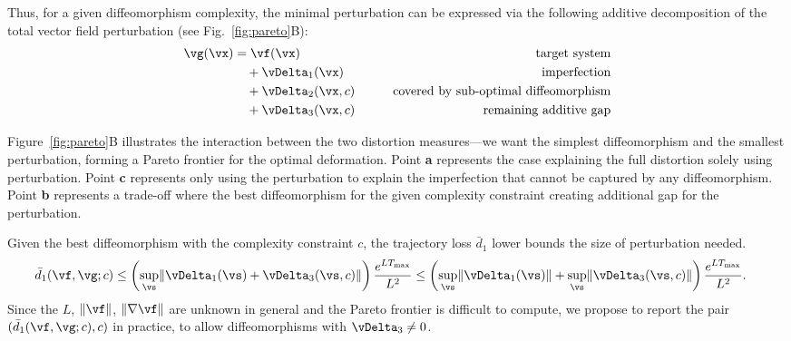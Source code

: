 \documentclass{article}
\theoremstyle{definition} \newtheorem{definition}{Definition}  \newtheorem{example}{Example}
\theoremstyle{remark} \newtheorem{remark}{Remark}
\newcounter{ct}
\DeclarePairedDelimiter{\norm}{\lVert}{\rVert}
\begin{document}
Thus, for a given diffeomorphism complexity, the minimal perturbation can be expressed via the following additive decomposition of the total vector field perturbation (see Fig.~\ref{fig:pareto}B):
\begin{align}\label{eq:decomp:triple}
    \vg(\vx) &= 
	\vf(\vx)
	&\qquad\text{target system}
	\\
	&\quad+\vDelta_1(\vx)
	&\qquad\text{imperfection}
	\\
	&\quad+\vDelta_2(\vx, c)
	&\qquad\text{covered by sub-optimal diffeomorphism}
	\\
	&\quad+\vDelta_3(\vx, c)
	&\qquad\text{remaining additive gap}
\end{align}

Figure~\ref{fig:pareto}B illustrates the interaction between the two distortion measures---we want the simplest diffeomorphism and the smallest perturbation, forming a Pareto frontier for the optimal deformation.
Point \textbf{a} represents the case explaining the full distortion solely using perturbation.
Point \textbf{c} represents only using the perturbation to explain the imperfection that cannot be captured by any diffeomorphism.
Point \textbf{b} represents a trade-off where the best diffeomorphism for the given complexity constraint creating additional gap for the perturbation.

Given the best diffeomorphism with the complexity constraint $c$, the trajectory loss $\bar{d}_1$ lower bounds the size of perturbation needed.
\begin{align}
    \bar{d}_1(\vf, \vg; c)
	&\leq
	    \left(\sup_\vs \norm{\vDelta_1(\vs) + \vDelta_3(\vs, c)}\right)
	    \frac{e^{LT_{\text{max}}}}{L^2}
	\leq
	    \left(\sup_\vs\norm{\vDelta_1(\vs)} + \sup_\vs\norm{\vDelta_3(\vs, c)}\right)
	    \frac{e^{LT_{\text{max}}}}{L^2}.
\end{align}
Since the $L$, $\norm{\vf}$, $\norm{\nabla\vf}$ are unknown in general and the Pareto frontier is difficult to compute, we propose to report the pair $(\bar{d}_1(\vf, \vg; c), c)$ in practice, to allow diffeomorphisms with $\vDelta_3 \neq 0$.
\end{document}
